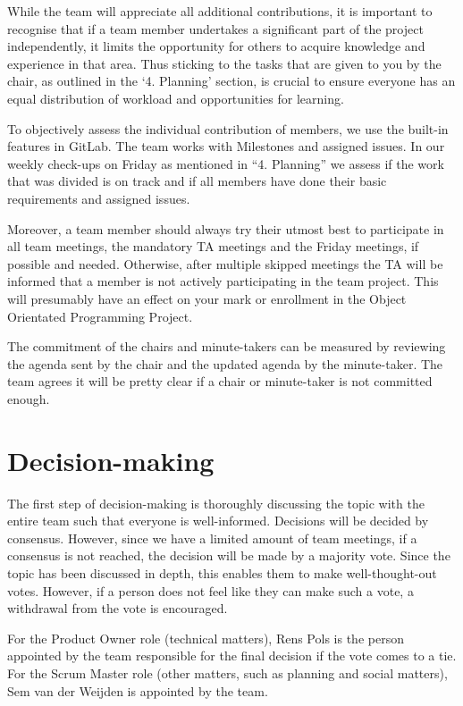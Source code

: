 \documentclass[sigconf,nonacm]{acmart}
\begin{document}
While the team will appreciate all additional contributions, it is important to recognise that if a team member undertakes a significant part of the project independently, it limits the opportunity for others to acquire knowledge and experience in that area. Thus sticking to the tasks that are given to you by the chair, as outlined in the ‘4. Planning’ section, is crucial to ensure everyone has an equal distribution of workload and opportunities for learning.

To objectively assess the individual contribution of members, we use the built-in features in GitLab. The team works with Milestones and assigned issues. In our weekly check-ups on Friday as mentioned in “4. Planning” we assess if the work that was divided is on track and if all members have done their basic requirements and assigned issues.

Moreover, a team member should always try their utmost best to participate in all team meetings, the mandatory TA meetings and the Friday meetings, if possible and needed. Otherwise, after multiple skipped meetings the TA will be informed that a member is not actively participating in the team project. This will presumably have an effect on your mark or enrollment in the Object Orientated Programming Project.

The commitment of the chairs and minute-takers can be measured by reviewing the agenda sent by the chair and the updated agenda by the minute-taker. The team agrees it will be pretty clear if a chair or minute-taker is not committed enough. 


\section{Decision-making}
The first step of decision-making is thoroughly discussing the topic with the entire team such that everyone is well-informed. Decisions will be decided by consensus. However, since we have a limited amount of team meetings, if a consensus is not reached, the decision will be made by a majority vote. Since the topic has been discussed in depth, this enables them to make well-thought-out votes. However, if a person does not feel like they can make such a vote, a withdrawal from the vote is encouraged.

For the Product Owner role (technical matters), Rens Pols is the person appointed by the team responsible for the final decision if the vote comes to a tie.
For the Scrum Master role (other matters, such as planning and social matters), Sem van der Weijden is appointed by the team.
\end{document}
